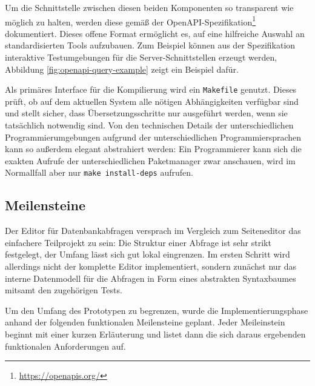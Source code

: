 Um die Schnittstelle zwischen diesen beiden Komponenten so transparent wie möglich zu halten, werden diese gemäß der OpenAPI-Spezifikation\footnote{\url{https://openapis.org/}} dokumentiert. Dieses offene Format ermöglicht es, auf eine hilfreiche Auswahl an standardisierten Tools aufzubauen. Zum Beispiel können aus der Spezifikation interaktive Testumgebungen für die Server-Schnittstellen erzeugt werden, Abbildung \ref{fig:openapi-query-example} zeigt ein Beispiel dafür.

Als primäres Interface für die Kompilierung wird ein \texttt{Makefile} genutzt. Dieses prüft, ob auf dem aktuellen System alle nötigen Abhängigkeiten verfügbar sind und stellt sicher, dass Übersetzungsschritte nur ausgeführt werden, wenn sie tatsächlich notwendig sind. Von den technischen Details der unterschiedlichen Programmierumgebungen aufgrund der unterschiedlichen Programmiersprachen kann so außerdem elegant abstrahiert werden: Ein Programmierer kann sich die exakten Aufrufe der unterschiedlichen Paketmanager zwar anschauen, wird im Normallfall aber nur \texttt{make install-deps} aufrufen.

\subsection{Meilensteine}
\label{sec:implementation-roadmap}

Der Editor für Datenbankabfragen versprach im Vergleich zum Seiteneditor das einfachere Teilprojekt zu sein: Die Struktur einer Abfrage ist sehr strikt festgelegt, der Umfang lässt sich gut lokal eingrenzen. Im ersten Schritt wird allerdings nicht der komplette Editor implementiert, sondern zunächst nur das interne Datenmodell für die Abfragen in Form eines abstrakten Syntaxbaumes mitsamt den zugehörigen Tests.

Um den Umfang des Prototypen zu begrenzen, wurde die Implementierungsphase anhand der folgenden funktionalen Meilensteine geplant. Jeder Meileinstein beginnt mit einer kurzen Erläuterung und listet dann die sich daraus ergebenden funktionalen Anforderungen auf.

